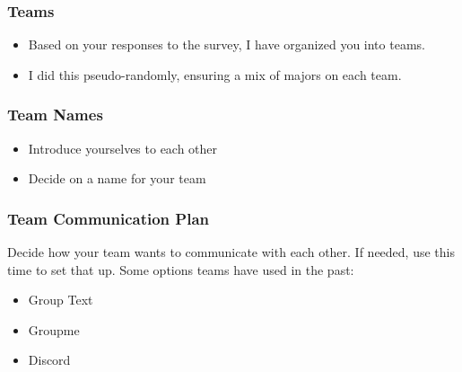 \documentclass[aspectration=1610]{beamer}
\begin{document}
\begin{frame}\frametitle{Teams}
\begin{itemize}
\item Based on your responses to the survey, I have organized you into teams.
\item I did this pseudo-randomly, ensuring a mix of majors on each team.
\end{itemize}
\end{frame}



\begin{frame}\frametitle{Team Names}
\begin{itemize}
\item Introduce yourselves to each other
\item Decide on a name for your team
\end{itemize}
\end{frame}

%


  




\begin{frame}\frametitle{Team Communication Plan}

Decide how your team wants to communicate with each other. If needed, use this time to set that up.
\vfill
Some options teams have used in the past:
\begin{itemize}
\item Group Text
\item Groupme
\item Discord
\end{itemize}
\end{frame}
\end{document}
